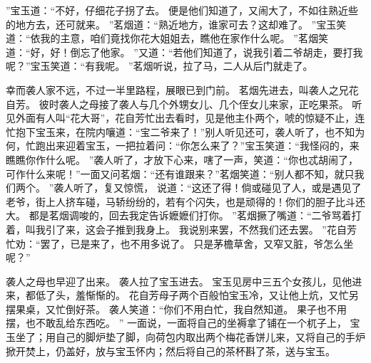 ”宝玉道：“不好，仔细花子拐了去。
便是他们知道了，又闹大了，不如往熟近些的地方去，还可就来。
”茗烟道：“熟近地方，谁家可去？这却难了。
”宝玉笑道：“依我的主意，咱们竟找你花大姐姐去，瞧他在家作什么呢。
”茗烟笑道：“好，好！倒忘了他家。
”又道：“若他们知道了，说我引着二爷胡走，要打我呢？”宝玉笑道：“有我呢。
”茗烟听说，拉了马，二人从后门就走了。
\par
幸而袭人家不远，不过一半里路程，展眼已到门前。
茗烟先进去，叫袭人之兄花自芳。
彼时袭人之母接了袭人与几个外甥女儿、几个侄女儿来家，正吃果茶。
听见外面有人叫“花大哥”，花自芳忙出去看时，见是他主仆两个，唬的惊疑不止，连忙抱下宝玉来，在院内嚷道：“宝二爷来了！”别人听见还可，袭人听了，也不知为何，忙跑出来迎着宝玉，一把拉着问：“你怎么来了？”宝玉笑道：“我怪闷的，来瞧瞧你作什么呢。
”袭人听了，才放下心来，嗐了一声，笑道：“你也忒胡闹了，可作什么来呢！”一面又问茗烟：“还有谁跟来？”茗烟笑道：“别人都不知，就只我们两个。
”袭人听了，复又惊慌，
说道：“这还了得！倘或碰见了人，或是遇见了老爷，街上人挤车碰，马轿纷纷的，若有个闪失，也是顽得的！你们的胆子比斗还大。
都是茗烟调唆的，回去我定告诉嬷嬷们打你。
”茗烟撅了嘴道：“二爷骂着打着，叫我引了来，这会子推到我身上。
我说别来罢，不然我们还去罢。
”花自芳忙劝：“罢了，已是来了，也不用多说了。
只是茅檐草舍，又窄又脏，爷怎么坐呢？”\par
袭人之母也早迎了出来。
袭人拉了宝玉进去。
宝玉见房中三五个女孩儿，见他进来，都低了头，羞惭惭的。
花自芳母子两个百般怕宝玉冷，又让他上炕，又忙另摆果桌，又忙倒好茶。
袭人笑道：“你们不用白忙，我自然知道。
果子也不用摆，也不敢乱给东西吃。
”
一面说，一面将自己的坐褥拿了铺在一个杌子上，
宝玉坐了；用自己的脚炉垫了脚，向荷包内取出两个梅花香饼儿来，又将自己的手炉掀开焚上，仍盖好，放与宝玉怀内；然后将自己的茶杯斟了茶，送与宝玉。
